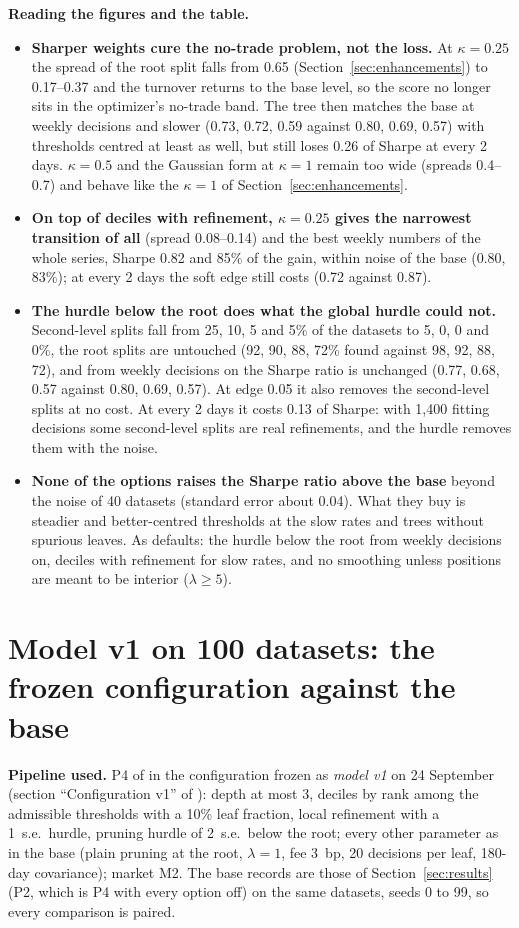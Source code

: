 \documentclass[11pt,a4paper]{article}
\newcommand{\code}[1]{\texttt{\detokenize{#1}}}
\newcommand{\1}{\mathbf{1}}
\begin{document}
\textbf{Reading the figures and the table.}
\begin{itemize}\setlength{\itemsep}{1pt}
\item \textbf{Sharper weights cure the no-trade problem, not the loss.} At $\kappa=0.25$ the spread of the root split falls from 0.65 (Section~\ref{sec:enhancements}) to 0.17--0.37 and the turnover returns to the base level, so the score no longer sits in the optimizer's no-trade band. The tree then matches the base at weekly decisions and slower (0.73, 0.72, 0.59 against 0.80, 0.69, 0.57) with thresholds centred at least as well, but still loses 0.26 of Sharpe at every 2 days. $\kappa=0.5$ and the Gaussian form at $\kappa=1$ remain too wide (spreads 0.4--0.7) and behave like the $\kappa=1$ of Section~\ref{sec:enhancements}.
\item \textbf{On top of deciles with refinement, $\kappa=0.25$ gives the narrowest transition of all} (spread 0.08--0.14) and the best weekly numbers of the whole series, Sharpe 0.82 and 85\% of the gain, within noise of the base (0.80, 83\%); at every 2 days the soft edge still costs (0.72 against 0.87).
\item \textbf{The hurdle below the root does what the global hurdle could not.} Second-level splits fall from 25, 10, 5 and 5\% of the datasets to 5, 0, 0 and 0\%, the root splits are untouched (92, 90, 88, 72\% found against 98, 92, 88, 72), and from weekly decisions on the Sharpe ratio is unchanged (0.77, 0.68, 0.57 against 0.80, 0.69, 0.57). At edge 0.05 it also removes the second-level splits at no cost. At every 2 days it costs 0.13 of Sharpe: with 1{,}400 fitting decisions some second-level splits are real refinements, and the hurdle removes them with the noise.
\item \textbf{None of the options raises the Sharpe ratio above the base} beyond the noise of 40 datasets (standard error about 0.04). What they buy is steadier and better-centred thresholds at the slow rates and trees without spurious leaves. As defaults: the hurdle below the root from weekly decisions on, deciles with refinement for slow rates, and no smoothing unless positions are meant to be interior ($\lambda\ge5$).
\end{itemize}

\section{Model v1 on 100 datasets: the frozen configuration against the base}\label{sec:v1}
\textbf{Pipeline used.} P4 of \code{model_history.md} in the configuration frozen as \emph{model v1} on 24 September (section ``Configuration v1'' of \code{model_and_training_pipeline.tex}): depth at most 3, deciles by rank among the admissible thresholds with a 10\% leaf fraction, local refinement with a 1~s.e.\ hurdle, pruning hurdle of 2~s.e.\ below the root; every other parameter as in the base (plain pruning at the root, $\lambda=1$, fee 3~bp, 20 decisions per leaf, 180-day covariance); market M2. The base records are those of Section~\ref{sec:results} (P2, which is P4 with every option off) on the same datasets, seeds 0 to 99, so every comparison is paired.
\end{document}
